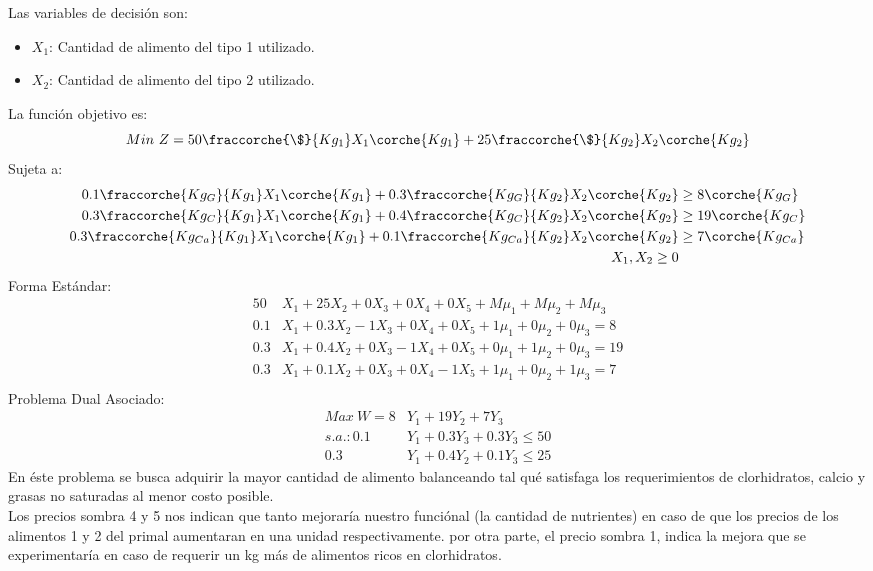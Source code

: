 \begin{homeworkProblem}
Las variables de decisión son:
\begin{itemize}
	\item $X_1$: Cantidad de alimento del tipo 1 utilizado.
	\item $X_2$: Cantidad de alimento del tipo 2 utilizado.
\end{itemize}
La función objetivo es: 
\begin{equation}
	Min\ Z = 50\fraccorche{\$}{Kg_1}X_1\corche{Kg_1} + 25\fraccorche{\$}{Kg_2}X_2\corche{Kg_2}
\end{equation}
Sujeta a:
\begin{align*}
	0.1\fraccorche{Kg_{G}}{Kg_1}X_1\corche{Kg_1} + 0.3\fraccorche{Kg_{G}}{Kg_2}X_2\corche{Kg_2} &\ge 8\corche{Kg_{G}} \\
	0.3\fraccorche{Kg_{C}}{Kg_1}X_1\corche{Kg_1} + 0.4\fraccorche{Kg_{C}}{Kg_2}X_2\corche{Kg_2} &\ge 19\corche{Kg_{C}} \\
	0.3\fraccorche{Kg_{Ca}}{Kg_1}X_1\corche{Kg_1} + 0.1\fraccorche{Kg_{Ca}}{Kg_2}X_2\corche{Kg_2} &\ge 7\corche{Kg_{Ca}} \\
	X_1,X_2 \ge 0 
\end{align*}
Forma Estándar:
\begin{align*}
50&X_1 + 25X_2 + 0X_3 + 0X_4 + 0X_5 + M\mu_1 + M\mu_2 + M\mu_3 \\
0.1&X_1 + 0.3X_2 -1X_3 + 0X_4 + 0X_5 + 1\mu_1 + 0\mu_2 + 0\mu_3 = 8\\
0.3&X_1 + 0.4X_2 +0X_3 -1X_4 + 0X_5 + 0\mu_1 + 1\mu_2 + 0\mu_3 = 19\\
0.3&X_1 + 0.1X_2  +0X_3 + 0X_4 - 1X_5 + 1\mu_1 + 0\mu_2 + 1\mu_3 = 7\\
\end{align*}
Problema Dual Asociado:
\begin{align*}
    Max\ W = 8&Y_1 + 19Y_2 + 7Y_3 \\
    s.a.: 0.1&Y_1 + 0.3Y_3 + 0.3Y_3 \le 50 \\
    0.3&Y_1 + 0.4Y_2 + 0.1Y_3 \le 25 
\end{align*}
En éste problema se busca adquirir la mayor cantidad de alimento balanceando tal qué satisfaga los requerimientos de clorhidratos, calcio y grasas no saturadas al menor costo posible. \\
Los precios sombra 4 y 5 nos indican que tanto mejoraría nuestro funciónal (la cantidad de nutrientes) en caso de que los precios de los alimentos 1 y 2 del primal aumentaran en una unidad respectivamente. por otra parte, el precio sombra 1, indica la mejora que se experimentaría en caso de requerir un kg más de alimentos ricos en clorhidratos.
\end{homeworkProblem}